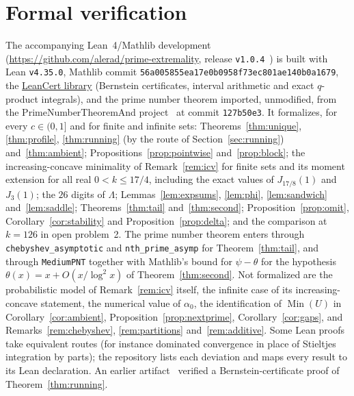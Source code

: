 \documentclass[11pt]{article}
\theoremstyle{remark}
\begin{document}
\section{Formal verification}\label{sec:formal}

The accompanying Lean~4/Mathlib development~\cite{Lean4,Mathlib}
(\url{https://github.com/alerad/prime-extremality}, release \texttt{v1.0.4}~\cite{Artifact}) is built with Lean
\texttt{v4.35.0}, Mathlib commit
\texttt{56a00585\allowbreak 5ea17e0b\allowbreak 0958f73e\allowbreak c801ae14\allowbreak 0b0a1679},
the \href{https://github.com/alerad/leancert}{LeanCert library}
(Bernstein certificates, interval arithmetic and exact $q$-product
integrals), and the prime number theorem imported,
unmodified, from the PrimeNumberTheoremAnd project~\cite{PNTplus} at
commit \texttt{127b50e3}. It formalizes, for every $c\in(0,1]$ and for
finite and infinite sets: Theorems~\ref{thm:unique},
\ref{thm:profile}, \ref{thm:running} (by the route of
Section~\ref{sec:running}) and~\ref{thm:ambient};
Propositions~\ref{prop:pointwise} and~\ref{prop:block}; the
increasing-concave minimality of Remark~\ref{rem:icv} for finite sets
and its moment extension for all real $0<k\le17/4$, including the exact
values of $J_{17/8}(1)$ and $J_3(1)$; the $26$ digits of $\Lambda$;
Lemmas~\ref{lem:expsums}, \ref{lem:phi}, \ref{lem:sandwich}
and~\ref{lem:saddle}; Theorems~\ref{thm:tail} and~\ref{thm:second};
Proposition~\ref{prop:omit}, Corollary~\ref{cor:stability} and
Proposition~\ref{prop:delta}; and the comparison at $k=126$ in open
problem~2. The prime number theorem enters through
\texttt{chebyshev\_asymptotic} and \texttt{nth\_prime\_asymp} for
Theorem~\ref{thm:tail}, and through \texttt{MediumPNT} together with
Mathlib's bound for $\psi-\theta$ for the hypothesis
$\theta(x)=x+O(x/\log^2x)$ of Theorem~\ref{thm:second}. Not formalized
are the probabilistic model of Remark~\ref{rem:icv} itself, the infinite
case of its increasing-concave statement, the numerical value of
$\alpha_0$, the identification of $\operatorname{Min}(U)$ in
Corollary~\ref{cor:ambient}, Proposition~\ref{prop:nextprime},
Corollary~\ref{cor:gaps}, and Remarks~\ref{rem:chebyshev},
\ref{rem:partitions} and~\ref{rem:additive}. Some Lean proofs take
equivalent routes (for instance dominated convergence in place of
Stieltjes integration by parts); the repository lists each deviation and
maps every result to its Lean declaration. An earlier
artifact~\cite{ProductInvariants} verified a Bernstein-certificate proof
of Theorem~\ref{thm:running}.
\end{document}
